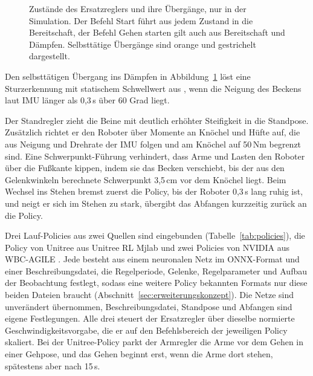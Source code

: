\begin{figure}[htbp]
  \centering
  
  \caption[Zustände des Ersatzreglers]{Zustände des Ersatzreglers und ihre Übergänge, nur in der Simulation. Der Befehl Start führt aus jedem Zustand in die Bereitschaft, der Befehl Gehen starten gilt auch aus Bereitschaft und Dämpfen. Selbsttätige Übergänge sind orange und gestrichelt dargestellt.}
  \label{fig:ersatzregler_zustaende}
\end{figure}

Den selbsttätigen Übergang ins Dämpfen in Abbildung~\ref{fig:ersatzregler_zustaende} löst eine Sturzerkennung mit statischem Schwellwert aus \cite{Subburaman2023}, wenn die Neigung des Beckens laut IMU länger als 0,3\,s über 60 Grad liegt.

Der Standregler zieht die Beine mit deutlich erhöhter Steifigkeit in die Standpose.
Zusätzlich richtet er den Roboter über Momente an Knöchel und Hüfte auf, die aus Neigung und Drehrate der IMU folgen und am Knöchel auf 50\,Nm begrenzt sind.
Eine Schwerpunkt-Führung verhindert, dass Arme und Lasten den Roboter über die Fußkante kippen, indem sie das Becken verschiebt, bis der aus den Gelenkwinkeln berechnete Schwerpunkt 3,5\,cm vor dem Knöchel liegt.
Beim Wechsel ins Stehen bremst zuerst die Policy, bis der Roboter 0,3\,s lang ruhig ist, und neigt er sich im Stehen zu stark, übergibt das Abfangen kurzzeitig zurück an die Policy.

Drei Lauf-Policies aus zwei Quellen sind eingebunden (Tabelle~\ref{tab:policies}), die Policy von Unitree aus Unitree RL Mjlab \cite{UnitreeRLMjlab} und zwei Policies von NVIDIA aus WBC-AGILE .
Jede besteht aus einem neuronalen Netz im ONNX-Format \cite{UnitreeRLMjlab} und einer Beschreibungsdatei, die Regelperiode, Gelenke, Regelparameter und Aufbau der Beobachtung festlegt, sodass eine weitere Policy bekannten Formats nur diese beiden Dateien braucht (Abschnitt~\ref{sec:erweiterungskonzept}).
Die Netze sind unverändert übernommen, Beschreibungsdatei, Standpose und Abfangen sind eigene Festlegungen.
Alle drei steuert der Ersatzregler über dieselbe normierte Geschwindigkeitsvorgabe, die er auf den Befehlsbereich der jeweiligen Policy skaliert.
Bei der Unitree-Policy parkt der Armregler die Arme vor dem Gehen in einer Gehpose, und das Gehen beginnt erst, wenn die Arme dort stehen, spätestens aber nach 15\,s.

